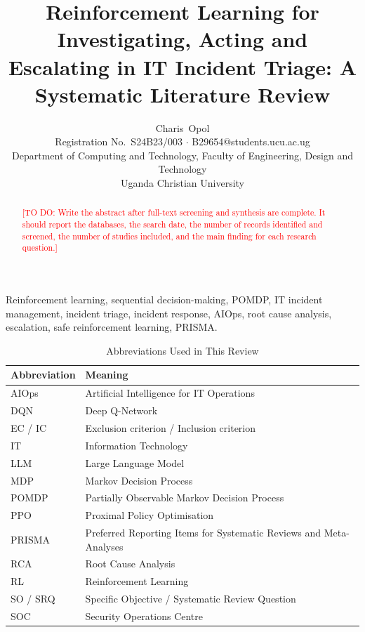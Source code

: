\documentclass[journal]{IEEEtran}
\newcommand{\todo}[1]{\textcolor{red}{[TO DO: #1]}}
\begin{document}
\title{Reinforcement Learning for Investigating, Acting and Escalating in IT Incident Triage: A Systematic Literature Review}

\author{Charis~Opol\\
Registration No.\ S24B23/003 $\cdot$ B29654@students.ucu.ac.ug\\
Department of Computing and Technology, Faculty of Engineering, Design and Technology\\
Uganda Christian University}

\maketitle

\begin{abstract}
\todo{Write the abstract after full-text screening and synthesis are complete. It should report the databases, the search date, the number of records identified and screened, the number of studies included, and the main finding for each research question.}
\end{abstract}

\begin{IEEEkeywords}
Reinforcement learning, sequential decision-making, POMDP, IT incident management, incident triage, incident response, AIOps, root cause analysis, escalation, safe reinforcement learning, PRISMA.
\end{IEEEkeywords}

\begin{table}[!t]
\centering
\caption{Abbreviations Used in This Review}
\label{tab:abbrev}
\footnotesize
\begin{tabularx}{\columnwidth}{@{}lL@{}}
\toprule
Abbreviation & Meaning \\
\midrule
AIOps & Artificial Intelligence for IT Operations \\
DQN & Deep Q-Network \\
EC / IC & Exclusion criterion / Inclusion criterion \\
IT & Information Technology \\
LLM & Large Language Model \\
MDP & Markov Decision Process \\
POMDP & Partially Observable Markov Decision Process \\
PPO & Proximal Policy Optimisation \\
PRISMA & Preferred Reporting Items for Systematic Reviews and Meta-Analyses \\
RCA & Root Cause Analysis \\
RL & Reinforcement Learning \\
SO / SRQ & Specific Objective / Systematic Review Question \\
SOC & Security Operations Centre \\
\bottomrule
\end{tabularx}
\end{table}
\end{document}
